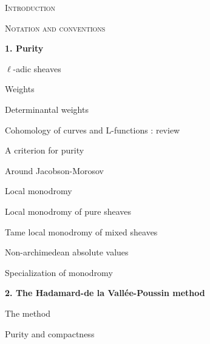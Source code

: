 \documentclass[11pt,leqno]{article}
\begin{document}
\begingroup
\small
\noindent\textsc{Introduction}\dotfill{}\par
\medskip
\noindent\textsc{Notation and conventions}\dotfill{}\par
\medskip
\noindent\textbf{1. Purity}\dotfill{}\par
\noindent\hspace*{1em}\(\ell\)-adic sheaves\dotfill{}\par
\noindent\hspace*{1em}Weights\dotfill{}\par
\noindent\hspace*{1em}Determinantal weights\dotfill{}\par
\noindent\hspace*{1em}Cohomology of curves and \(\mathrm{L}\)-functions : review\dotfill{}\par
\noindent\hspace*{1em}A criterion for purity\dotfill{}\par
\noindent\hspace*{1em}Around Jacobson-Morosov\dotfill{}\par
\noindent\hspace*{1em}Local monodromy\dotfill{}\par
\noindent\hspace*{1em}Local monodromy of pure sheaves\dotfill{}\par
\noindent\hspace*{1em}Tame local monodromy of mixed sheaves\dotfill{}\par
\noindent\hspace*{1em}Non-archimedean absolute values\dotfill{}\par
\noindent\hspace*{1em}Specialization of monodromy\dotfill{}\par
\medskip
\noindent\textbf{2. The Hadamard-de la Vallée-Poussin method}\dotfill{}\par
\noindent\hspace*{1em}The method\dotfill{}\par
\noindent\hspace*{1em}Purity and compactness\dotfill{}\par
\end{document}
